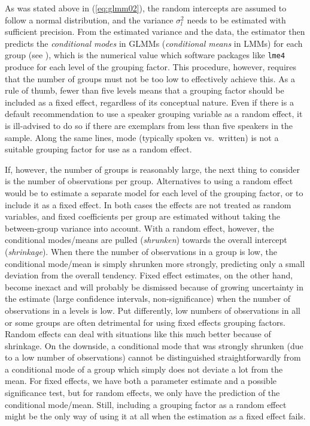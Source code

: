 \documentclass[a4paper,12pt]{article}
\begin{document}
As was stated above in (\ref{eq:glmm02}), the random intercepts are assumed to follow a normal distribution, and the variance $\sigma_l^2$ needs to be estimated with sufficient precision.
From the estimated variance and the data, the estimator then predicts the \textit{conditional modes} in GLMMs (\textit{conditional means} in LMMs) for each group (see \citealt[Ch.~1]{Bates2010}), which is the numerical value which software packages like \texttt{lme4} produce for each level of the grouping factor.
This procedure, however, requires that the number of groups must not be too low to effectively achieve this.
As a rule of thumb, fewer than five levels means that a grouping factor should be included as a fixed effect, regardless of its conceptual nature.
Even if there is a default recommendation to use a speaker grouping variable as a random effect, it is ill-advised to do so if there are exemplars from less than five speakers in the sample.
Along the same lines, mode (typically spoken vs.\ written) is not a suitable grouping factor for use as a random effect.

If, however, the number of groups is reasonably large, the next thing to consider is the number of observations per group.
Alternatives to using a random effect would be to estimate a separate model for each level of the grouping factor, or to include it as a fixed effect.
In both cases the effects are not treated as random variables, and fixed coefficients per group are estimated without taking the between-group variance into account.
With a random effect, however, the conditional modes\slash means are pulled (\textit{shrunken}) towards the overall intercept (\textit{shrinkage}).
When there the number of observations in a group is low, the conditional mode\slash mean is simply shrunken more strongly, predicting only a small deviation from the overall tendency.
Fixed effect estimates, on the other hand, become inexact and will probably be dismissed because of growing uncertainty in the estimate (large confidence intervals, non-significance) when the number of observations in a levels is low.
Put differently, low numbers of observations in all or some groups are often detrimental for using fixed effects grouping factors.
Random effects can deal with situations like this much better because of shrinkage.
On the downside, a conditional mode that was strongly shrunken (due to a low number of observations) cannot be distinguished straightforwardly from a conditional mode of a group which simply does not deviate a lot from the mean.
For fixed effects, we have both a parameter estimate and a possible significance test, but for random effects, we only have the prediction of the conditional mode\slash mean.
Still, including a grouping factor as a random effect might be the only way of using it at all when the estimation as a fixed effect fails.
\end{document}
